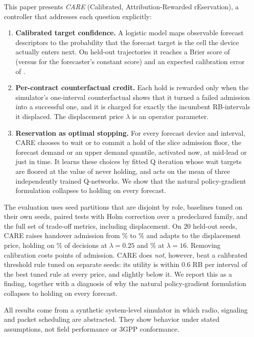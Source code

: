 \documentclass[journal]{IEEEtran}
\begin{document}
This paper presents \emph{CARE} (Calibrated, Attribution-Rewarded rEservation), a controller that addresses each question explicitly:
\begin{enumerate}
\item \textbf{Calibrated target confidence.} A logistic model maps observable forecast descriptors to the probability that the forecast target is the cell the device actually enters next. On held-out trajectories it reaches a Brier score of \CalBrier{} (versus \ConstBrier{} for the forecaster's constant score) and an expected calibration error of \CalECE{}.
\item \textbf{Per-contract counterfactual credit.} Each hold is rewarded only when the simulator's one-interval counterfactual shows that it turned a failed admission into a successful one, and it is charged for exactly the incumbent RB-intervals it displaced. The displacement price $\lambda$ is an operator parameter.
\item \textbf{Reservation as optimal stopping.} For every forecast device and interval, CARE chooses to wait or to commit a hold of the slice admission floor, the forecast demand or an upper demand quantile, activated now, at mid-lead or just in time. It learns these choices by fitted Q iteration whose wait targets are floored at the value of never holding, and acts on the mean of three independently trained Q-networks. We show that the natural policy-gradient formulation collapses to holding on every forecast.
\end{enumerate}
The evaluation uses seed partitions that are disjoint by role, baselines tuned on their own seeds, paired tests with Holm correction over a predeclared family, and the full set of trade-off metrics, including displacement. On 20 held-out seeds, CARE raises handover admission from \NoResHSR\% to \CareHSR\% and adapts to the displacement price, holding on \LamQuarterCareHold\% of decisions at $\lambda=0.25$ and \LamSixteenCareHold\% at $\lambda=16$. Removing calibration costs \VsCareUncalHSRDiff{} points of admission. CARE does \emph{not}, however, beat a calibrated threshold rule tuned on separate seeds: its utility is within $0.6$ RB per interval of the best tuned rule at every price, and slightly below it. We report this as a finding, together with a diagnosis of why the natural policy-gradient formulation collapses to holding on every forecast.

All results come from a synthetic system-level simulator in which radio, signaling and packet scheduling are abstracted. They show behavior under stated assumptions, not field performance or 3GPP conformance.
\end{document}
